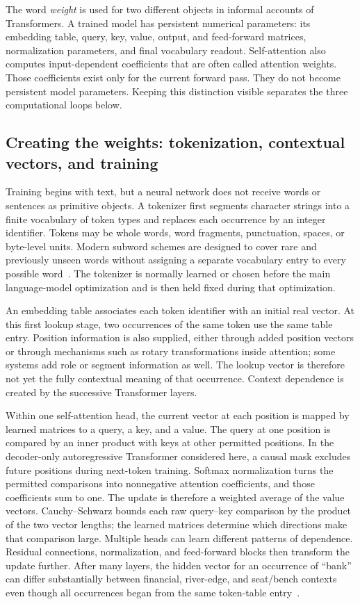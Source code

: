 \documentclass[
  aps,
  reprint,
  superscriptaddress,
  floatfix,
  nofootinbib,
  longbibliography
]{revtex4-2}
\begin{document}
The word \emph{weight} is used for two different objects in informal accounts
of Transformers.  A trained model has persistent numerical parameters: its
embedding table, query, key, value, output, and feed-forward matrices,
normalization parameters, and final vocabulary readout.  Self-attention also
computes input-dependent coefficients that are often called attention
weights.  Those coefficients exist only for the current forward pass.  They
do not become persistent model parameters.  Keeping this distinction visible
separates the three computational loops below.

\subsection{Creating the weights: tokenization, contextual vectors, and training}
\label{sec:prose-training}

Training begins with text, but a neural network does not receive words or
sentences as primitive objects.  A tokenizer first segments character strings
into a finite vocabulary of token types and replaces each occurrence by an
integer identifier.  Tokens may be whole words, word fragments, punctuation,
spaces, or byte-level units.  Modern subword schemes are designed to cover
rare and previously unseen words without assigning a separate vocabulary
entry to every possible word~\cite{sennrich2016subword,Brown2020May}.  The
tokenizer is normally learned or chosen before the main language-model
optimization and is then held fixed during that optimization.

An embedding table associates each token identifier with an initial real
vector.  At this first lookup stage, two occurrences of the same token use the
same table entry.  Position information is also supplied, either through
added position vectors or through mechanisms such as rotary transformations
inside attention; some systems add role or segment information as well.  The
lookup vector is therefore not yet the fully contextual meaning of that
occurrence.  Context dependence is created by the successive Transformer
layers.

Within one self-attention head, the current vector at each position is mapped
by learned matrices to a query, a key, and a value.  The query at one position
is compared by an inner product with keys at other permitted positions.  In
the decoder-only autoregressive Transformer considered here, a causal mask
excludes future positions during next-token training.  Softmax normalization
turns the permitted comparisons into nonnegative attention coefficients, and
those coefficients sum to one.  The update is therefore a weighted average of
the value vectors.  Cauchy--Schwarz bounds each raw query--key comparison by the
product of the two vector lengths; the learned matrices determine which
directions make that comparison large.
Multiple heads can learn different patterns of dependence.  Residual
connections, normalization, and feed-forward blocks then transform the update
further.  After many layers, the hidden vector for an occurrence of ``bank''
can differ substantially between financial, river-edge, and seat/bench
contexts even though all occurrences began from the same token-table
entry~\cite{Vaswani-2017-Attention}.
\end{document}
